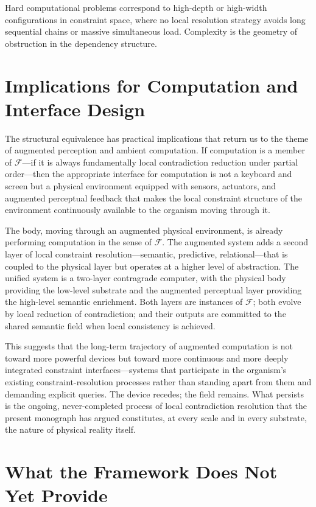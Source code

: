 \documentclass[12pt,a4paper,openany]{book}
\theoremstyle{plain}
\theoremstyle{definition}
\theoremstyle{remark}
\begin{document}
Hard computational problems correspond to high-depth or high-width configurations in constraint space, where no local resolution strategy avoids long sequential chains or massive simultaneous load. Complexity is the geometry of obstruction in the dependency structure.

\section{Implications for Computation and Interface Design}

The structural equivalence has practical implications that return us to the theme of augmented perception and ambient computation. If computation is a member of $\mathcal{F}$---if it is always fundamentally local contradiction reduction under partial order---then the appropriate interface for computation is not a keyboard and screen but a physical environment equipped with sensors, actuators, and augmented perceptual feedback that makes the local constraint structure of the environment continuously available to the organism moving through it.

The body, moving through an augmented physical environment, is already performing computation in the sense of $\mathcal{F}$. The augmented system adds a second layer of local constraint resolution---semantic, predictive, relational---that is coupled to the physical layer but operates at a higher level of abstraction. The unified system is a two-layer contragrade computer, with the physical body providing the low-level substrate and the augmented perceptual layer providing the high-level semantic enrichment. Both layers are instances of $\mathcal{F}$; both evolve by local reduction of contradiction; and their outputs are committed to the shared semantic field when local consistency is achieved.

This suggests that the long-term trajectory of augmented computation is not toward more powerful devices but toward more continuous and more deeply integrated constraint interfaces---systems that participate in the organism's existing constraint-resolution processes rather than standing apart from them and demanding explicit queries. The device recedes; the field remains. What persists is the ongoing, never-completed process of local contradiction resolution that the present monograph has argued constitutes, at every scale and in every substrate, the nature of physical reality itself.

\section{What the Framework Does Not Yet Provide}
\end{document}

